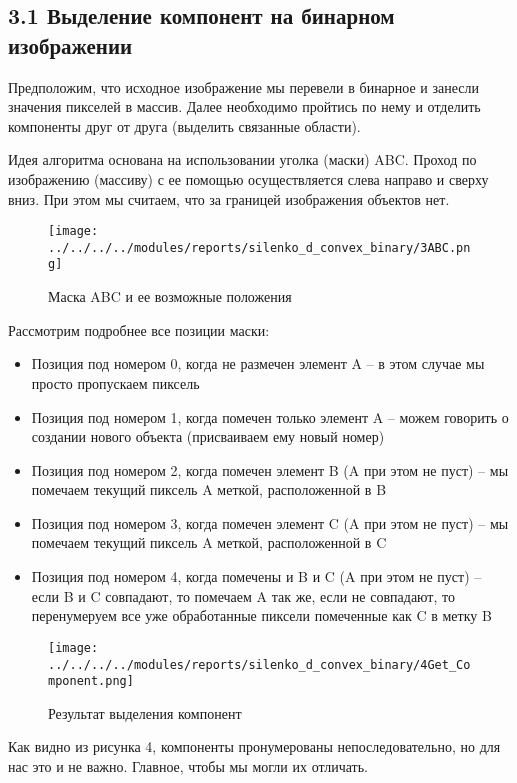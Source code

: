 \documentclass{report}
\begin{document}
\subsection*{3.1 Выделение компонент на бинарном изображении}
\par Предположим, что исходное изображение мы перевели в бинарное и занесли значения пикселей в массив. Далее необходимо пройтись по нему и отделить компоненты друг от друга (выделить связанные области). 
\par Идея алгоритма основана на использовании уголка (маски) ABC. Проход по изображению (массиву) с ее помощью осуществляется слева направо и сверху вниз. При этом мы считаем, что за границей изображения объектов нет.
\begin{figure}[htbp]
  \centering
  \texttt{[image: ../../../../modules/reports/silenko\_d\_convex\_binary/3ABC.png]}
  \caption{Маска ABC и ее возможные положения}\label{fig:../../../../modules/reports/silenko_d_convex_binary/3ABC.png}
\end{figure}
\par Рассмотрим подробнее все позиции маски:
\begin{itemize}
\item Позиция под номером 0, когда не размечен элемент A – в этом случае мы просто пропускаем пиксель
\item Позиция под номером 1, когда помечен только элемент A – можем говорить о создании нового объекта (присваиваем ему новый номер)
\item Позиция под номером 2, когда помечен элемент B (A при этом не пуст) – мы помечаем текущий пиксель A меткой, расположенной в B
\item Позиция под номером 3, когда помечен элемент C (A при этом не пуст) – мы помечаем текущий пиксель A меткой, расположенной в C
\item Позиция под номером 4, когда помечены и B и C (A при этом не пуст) – если B и C совпадают, то помечаем A так же, если не совпадают, то перенумеруем все уже обработанные пиксели помеченные как C в метку B
\end{itemize}
\begin{figure}[htbp]
  \centering
  \texttt{[image: ../../../../modules/reports/silenko\_d\_convex\_binary/4Get\_Component.png]}
  \caption{Результат выделения компонент}\label{fig:../../../../modules/reports/silenko_d_convex_binary/4Get_Component.png}
\end{figure}
\par Как видно из рисунка 4, компоненты пронумерованы непоследовательно, но для нас это и не важно. Главное, чтобы мы могли их отличать.
\end{document}
